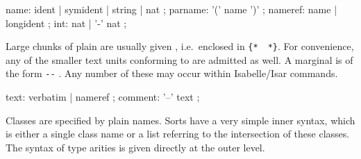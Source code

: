 \begin{isabellebody}
\begin{isamarkuptext}
  \begin{rail}
    name: ident | symident | string | nat
    ;
    parname: '(' name ')'
    ;
    nameref: name | longident
    ;
    int: nat | '-' nat
    ;
  \end{rail}%
\end{isamarkuptext}%
\isamarkuptrue%
%
\isamarkuptrue%
%
\begin{isamarkuptext}%
Large chunks of plain  are usually given
  , i.e.\ enclosed in \verb|{|\verb|*|~\isa{{\isachardoublequote}{\isasymdots}{\isachardoublequote}}~\verb|*|\verb|}|.  For convenience,
  any of the smaller text units conforming to  are
  admitted as well.  A marginal  is of the form
  \verb|--| .  Any number of these may occur
  within Isabelle/Isar commands.

  \begin{rail}
    text: verbatim | nameref
    ;
    comment: '--' text
    ;
  \end{rail}%
\end{isamarkuptext}%
\isamarkuptrue%
%
\isamarkuptrue%
%
\begin{isamarkuptext}%
Classes are specified by plain names.  Sorts have a very simple
  inner syntax, which is either a single class name  or a
  list  referring to the
  intersection of these classes.  The syntax of type arities is given
  directly at the outer level.


\end{isamarkuptext}
\end{isabellebody}

